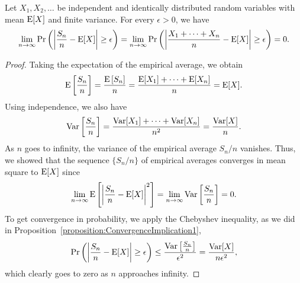 \begin{theorem} 
Let $X_1, X_2, \ldots$ be independent and identically distributed random variables with mean $\mathrm{E} [X]$ and finite variance.
For every $\epsilon > 0$, we have
\begin{equation*}
\lim_{n \rightarrow \infty}
\Pr \left( \left| \frac{S_n}{n} - \mathrm{E} [X] \right| \geq \epsilon \right)
= \lim_{n \rightarrow \infty}
\Pr \left( \left| \frac{X_1 + \cdots + X_n}{n} - \mathrm{E} [X] \right| \geq \epsilon \right)
= 0 .
\end{equation*}
\end{theorem}
\begin{proof}
Taking the expectation of the empirical average, we obtain
\begin{equation*}
\mathrm{E} \left[ \frac{S_n}{n} \right]
= \frac{ \mathrm{E} \left[ S_n \right] }{n}
= \frac{\mathrm{E} [X_1] + \cdots + \mathrm{E} [X_n] }{n}
= \mathrm{E} [X] .
\end{equation*}
Using independence, we also have
\begin{equation*}
\mathrm{Var} \left[ \frac{S_n}{n} \right]
= \frac{ \mathrm{Var} [X_1] + \cdots + \mathrm{Var} [X_n] }{n^2}
= \frac{ \mathrm{Var} [X] }{n} .
\end{equation*}
As $n$ goes to infinity, the variance of the empirical average $S_n / n$ vanishes.
Thus, we showed that the sequence $\{ S_n / n \}$ of empirical averages converges in mean square to $\mathrm{E} [X]$ since
\begin{equation*}
\lim_{n \rightarrow \infty}
\mathrm{E} \left[ \left| \frac{S_n}{n} - \mathrm{E} [X] \right|^2 \right] 
= \lim_{n \rightarrow \infty}
\mathrm{Var} \left[ \frac{S_n}{n} \right] = 0 .
\end{equation*}
To get convergence in probability, we apply the Chebyshev inequality, as we did in Proposition~\ref{proposition:ConvergenceImplication1},
\begin{equation*}
\Pr \left( \left| \frac{S_n}{n} - \mathrm{E} [X] \right| \geq \epsilon \right)
\leq \frac{ \mathrm{Var} \left[ \frac{S_n}{n} \right] }{\epsilon^2}
= \frac{ \mathrm{Var} [X] }{n \epsilon^2} ,
\end{equation*}
which clearly goes to zero as $n$ approaches infinity.
\end{proof}

